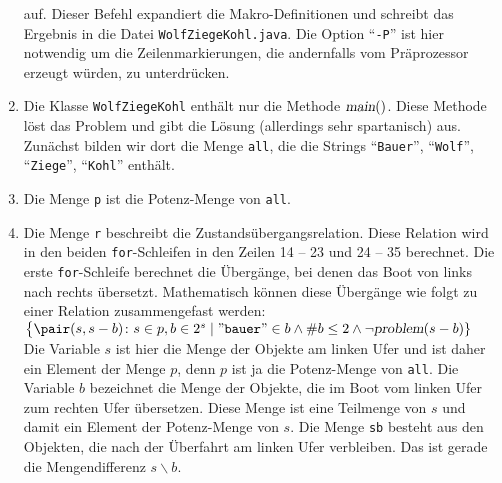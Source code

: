 \begin{enumerate}
      auf.  Dieser Befehl expandiert die Makro-Definitionen und schreibt das Ergebnis in
      die Datei \texttt{WolfZiegeKohl.java}.  Die Option ``\texttt{-P}'' ist hier
      notwendig um die Zeilenmarkierungen, die andernfalls vom Pr\"aprozessor erzeugt
      w\"urden, zu unterdr\"ucken. 
\item Die Klasse \texttt{WolfZiegeKohl} enth\"alt nur die Methode $\textsl{main}()$.
      Diese Methode l\"ost das Problem und gibt die L\"osung (allerdings sehr spartanisch) aus.
      Zun\"achst bilden wir dort die Menge  \texttt{all}, die die Strings
      ``\texttt{Bauer}'',
      ``\texttt{Wolf}'',
      ``\texttt{Ziege}'',
      ``\texttt{Kohl}'' enth\"alt.
\item Die Menge \texttt{p} ist die Potenz-Menge von \texttt{all}.  
\item Die Menge \texttt{r} beschreibt die Zustands\"ubergangsrelation.
      Diese Relation wird in den beiden \texttt{for}-Schleifen in den Zeilen
      14 -- 23 und 24 -- 35 berechnet.
      Die erste \texttt{for}-Schleife berechnet die Überg\"ange, bei denen
      das Boot von links nach rechts \"ubersetzt.  Mathematisch k\"onnen diese Überg\"ange wie
      folgt zu einer Relation zusammengefast werden:
      \\[0.2cm]
      \hspace*{1.3cm}
      $\bigl\{ \pair(s, s - b) \colon s \in p, b \in  2^s \mid
               \mathtt{\symbol{34}bauer\symbol{34}} \in b \wedge \#b \leq 2 \wedge \neg
               \textsl{problem}(s - b) \}$
      \\[0.2cm]
      Die Variable $s$ ist hier die Menge der Objekte am linken Ufer und ist daher ein
      Element der Menge $p$, denn $p$ ist ja die Potenz-Menge von \texttt{all}.  Die
      Variable $b$ bezeichnet die Menge der Objekte, die im Boot vom linken Ufer zum
      rechten Ufer \"ubersetzen.  Diese Menge ist eine
      Teilmenge von $s$ und damit ein Element der Potenz-Menge von $s$.  
      Die Menge \texttt{sb} besteht
      aus den Objekten, die nach der Überfahrt am linken Ufer verbleiben.
      Das ist gerade die Mengendifferenz $s \backslash b$.  
      

\end{enumerate}
